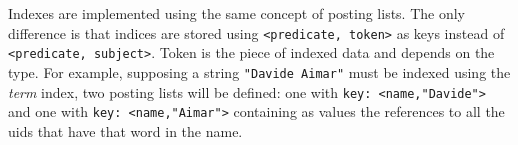 Indexes are implemented using the same concept of posting lists. The only difference is that indices are stored using \lstinline{<predicate, token>} as keys instead of \lstinline{<predicate, subject>}. Token is the piece of indexed data and depends on the type. For example, supposing a string \lstinline{"Davide Aimar"} must be indexed using the \textit{term} index, two posting lists will be defined: one with \lstinline{key: <name,"Davide">} and one with \lstinline{key: <name,"Aimar">} containing as values the references to all the uids that have that word in the name.



